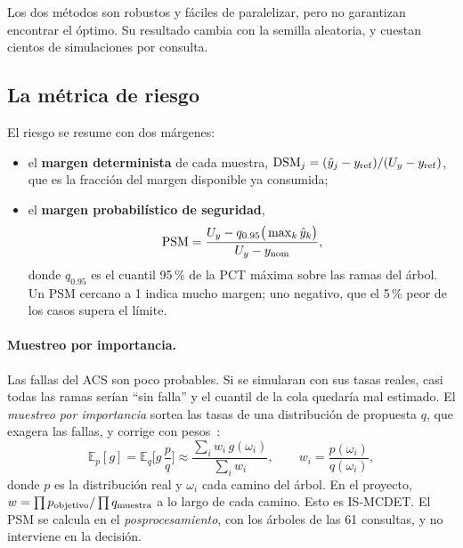 \medskip
\noindent Los dos métodos son robustos y fáciles de paralelizar, pero no garantizan encontrar el
óptimo. Su resultado cambia con la semilla aleatoria, y cuestan cientos de simulaciones por
consulta.

\subsection{La métrica de riesgo}
El riesgo se resume con dos márgenes:
\begin{itemize}
  \item el \textbf{margen determinista} de cada muestra,
        $\mathrm{DSM}_j=(\hat y_j-y_{\rm ref})/(U_y-y_{\rm ref})$, que es la fracción del margen
        disponible ya consumida;
  \item el \textbf{margen probabilístico de seguridad},
        \[
        \mathrm{PSM}=\frac{U_y-q_{0.95}\big(\max_k\hat y_k\big)}{U_y-y_{\rm nom}},
        \]
        donde $q_{0.95}$ es el cuantil 95\,\% de la PCT máxima sobre las ramas del árbol. Un PSM
        cercano a 1 indica mucho margen; uno negativo, que el 5\,\% peor de los casos supera el
        límite.
\end{itemize}

\paragraph{Muestreo por importancia.} Las fallas del ACS son poco probables. Si se
simularan con sus tasas reales, casi todas las ramas serían ``sin falla'' y el cuantil de la
cola quedaría mal estimado. El \emph{muestreo por importancia} sortea las tasas de una
distribución de propuesta $q$, que exagera las fallas, y corrige con pesos~\cite{owen2013}:
\[
\mathbb E_p[g]=\mathbb E_q\Big[g\,\frac{p}{q}\Big]\approx\frac{\sum_iw_i\,g(\omega_i)}{\sum_iw_i},
\qquad w_i=\frac{p(\omega_i)}{q(\omega_i)},
\]
donde $p$ es la distribución real y $\omega_i$ cada camino del árbol. En el proyecto,
$w=\prod p_{\rm objetivo}/\prod q_{\rm muestra}$ a lo largo de cada camino. Esto es
IS-MCDET. El PSM se calcula en el \emph{posprocesamiento}, con los árboles de las 61
consultas, y no interviene en la decisión.

